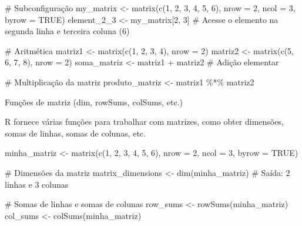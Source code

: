 \documentclass[
  letterpaper,
  DIV=11,
  numbers=noendperiod]{scrartcl}
\newenvironment{Shaded}{\begin{snugshade}}{\end{snugshade}}
\newcommand{\AttributeTok}[1]{\textcolor[rgb]{0.40,0.45,0.13}{#1}}
\newcommand{\CommentTok}[1]{\textcolor[rgb]{0.37,0.37,0.37}{#1}}
\newcommand{\ConstantTok}[1]{\textcolor[rgb]{0.56,0.35,0.01}{#1}}
\newcommand{\DecValTok}[1]{\textcolor[rgb]{0.68,0.00,0.00}{#1}}
\newcommand{\FunctionTok}[1]{\textcolor[rgb]{0.28,0.35,0.67}{#1}}
\newcommand{\NormalTok}[1]{\textcolor[rgb]{0.00,0.23,0.31}{#1}}
\newcommand{\OtherTok}[1]{\textcolor[rgb]{0.00,0.23,0.31}{#1}}
\newcommand{\SpecialCharTok}[1]{\textcolor[rgb]{0.37,0.37,0.37}{#1}}
\begin{document}
\begin{Shaded}
\begin{Highlighting}[]
\CommentTok{\# Subconfiguração}
\NormalTok{my\_matrix }\OtherTok{\textless{}{-}} \FunctionTok{matrix}\NormalTok{(}\FunctionTok{c}\NormalTok{(}\DecValTok{1}\NormalTok{, }\DecValTok{2}\NormalTok{, }\DecValTok{3}\NormalTok{, }\DecValTok{4}\NormalTok{, }\DecValTok{5}\NormalTok{, }\DecValTok{6}\NormalTok{), }\AttributeTok{nrow =} \DecValTok{2}\NormalTok{, }\AttributeTok{ncol =} \DecValTok{3}\NormalTok{, }\AttributeTok{byrow =} \ConstantTok{TRUE}\NormalTok{)}
\NormalTok{element\_2\_3 }\OtherTok{\textless{}{-}}\NormalTok{ my\_matrix[}\DecValTok{2}\NormalTok{, }\DecValTok{3}\NormalTok{] }\CommentTok{\# Acesse o elemento na segunda linha e terceira coluna (6)}

\CommentTok{\# Aritmética}
\NormalTok{matriz1 }\OtherTok{\textless{}{-}} \FunctionTok{matrix}\NormalTok{(}\FunctionTok{c}\NormalTok{(}\DecValTok{1}\NormalTok{, }\DecValTok{2}\NormalTok{, }\DecValTok{3}\NormalTok{, }\DecValTok{4}\NormalTok{), }\AttributeTok{nrow =} \DecValTok{2}\NormalTok{)}
\NormalTok{matriz2 }\OtherTok{\textless{}{-}} \FunctionTok{matrix}\NormalTok{(}\FunctionTok{c}\NormalTok{(}\DecValTok{5}\NormalTok{, }\DecValTok{6}\NormalTok{, }\DecValTok{7}\NormalTok{, }\DecValTok{8}\NormalTok{), }\AttributeTok{nrow =} \DecValTok{2}\NormalTok{)}
\NormalTok{soma\_matriz }\OtherTok{\textless{}{-}}\NormalTok{ matriz1 }\SpecialCharTok{+}\NormalTok{ matriz2 }\CommentTok{\# Adição elementar}

\CommentTok{\# Multiplicação da matriz}
\NormalTok{produto\_matriz }\OtherTok{\textless{}{-}}\NormalTok{ matriz1 }\SpecialCharTok{\%*\%}\NormalTok{ matriz2}
\end{Highlighting}
\end{Shaded}

Funções de matriz (dim, rowSums, colSums, etc.)

R fornece várias funções para trabalhar com matrizes, como obter
dimensões, somas de linhas, somas de colunas, etc.

\begin{Shaded}
\begin{Highlighting}[]
\NormalTok{minha\_matriz }\OtherTok{\textless{}{-}} \FunctionTok{matrix}\NormalTok{(}\FunctionTok{c}\NormalTok{(}\DecValTok{1}\NormalTok{, }\DecValTok{2}\NormalTok{, }\DecValTok{3}\NormalTok{, }\DecValTok{4}\NormalTok{, }\DecValTok{5}\NormalTok{, }\DecValTok{6}\NormalTok{), }\AttributeTok{nrow =} \DecValTok{2}\NormalTok{, }\AttributeTok{ncol =} \DecValTok{3}\NormalTok{, }\AttributeTok{byrow =} \ConstantTok{TRUE}\NormalTok{)}

\CommentTok{\# Dimensões da matriz}
\NormalTok{matrix\_dimensions }\OtherTok{\textless{}{-}} \FunctionTok{dim}\NormalTok{(minha\_matriz) }\CommentTok{\# Saída: 2 linhas e 3 colunas}

\CommentTok{\# Somas de linhas e somas de colunas}
\NormalTok{row\_sums }\OtherTok{\textless{}{-}} \FunctionTok{rowSums}\NormalTok{(minha\_matriz)}
\NormalTok{col\_sums }\OtherTok{\textless{}{-}} \FunctionTok{colSums}\NormalTok{(minha\_matriz)}
\end{Highlighting}
\end{Shaded}
\end{document}
